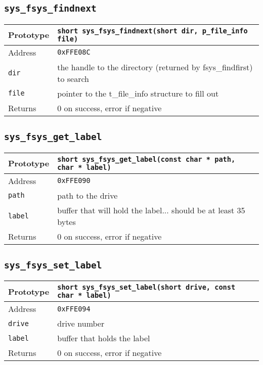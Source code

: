 \subsection*{\texttt{sys\_fsys\_findnext}}
\begin{tabular}{|l||l|} \hline
Prototype & \lstinline!short sys_fsys_findnext(short dir, p_file_info file)! \\ \hline
Address & \texttt{0xFFE08C} \\ \hline
\lstinline!dir! & the handle to the directory (returned by fsys\_findfirst) to search \\ \hline
\lstinline!file! & pointer to the t\_file\_info structure to fill out \\ \hline
Returns & 0 on success, error if negative \\ \hline
\end{tabular}

\subsection*{\texttt{sys\_fsys\_get\_label}}
\begin{tabular}{|l||l|} \hline
Prototype & \lstinline!short sys_fsys_get_label(const char * path, char * label)! \\ \hline
Address & \texttt{0xFFE090} \\ \hline
\lstinline!path! & path to the drive \\ \hline
\lstinline!label! & buffer that will hold the label... should be at least 35 bytes \\ \hline
Returns & 0 on success, error if negative \\ \hline
\end{tabular}

\subsection*{\texttt{sys\_fsys\_set\_label}}
\begin{tabular}{|l||l|} \hline
Prototype & \lstinline!short sys_fsys_set_label(short drive, const char * label)! \\ \hline
Address & \texttt{0xFFE094} \\ \hline
\lstinline!drive! & drive number \\ \hline
\lstinline!label! & buffer that holds the label \\ \hline
Returns & 0 on success, error if negative \\ \hline
\end{tabular}


